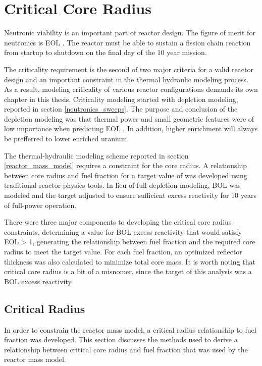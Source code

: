 \section{Critical Core Radius}

Neutronic viability is an important part of reactor design. The figure of merit
for neutronics is EOL \keff. The reactor must be able to sustain a fission
chain reaction from startup to shutdown on the final day of the 10 year mission.

The criticality requirement is the second of two major criteria for a valid reactor design and an
important constraint in the thermal hydraulic modeling process. As a result,
modeling criticality of various reactor configurations demands its own chapter
in this thesis. Criticality modeling started with depletion modeling, reported
in section \ref{neutronics_sweeps}. The purpose and conclusion of the depletion
modeling was that thermal power and small geometric features were of low
importance when predicting EOL \keff. In addition, higher enrichment will always
be prefferred to lower enriched uranium.

The thermal-hydraulic modeling scheme
reported in section \ref{reactor_mass_model} requires a constraint for the core
radius. A relationship between core radius and fuel fraction for a target
value of \keff was developed using traditional reactor physics tools. In lieu of
full depletion modeling, BOL \keff was modeled and the \keff target adjusted to
ensure sufficient excess reactivity for 10 years of full-power operation.

There were three major components to developing the critical core radius
constraints, determining a value for BOL excess reactivity that would satisfy
EOL \keff > 1, generating the relationship between fuel fraction and the
required core radius to meet the target \keff value. For each fuel fraction, an
optimized reflector thickness was also calculated to minimize total core mass.
It is worth noting that critical core radius is a
bit of a misnomer, since the target of this analysis was a BOL excess
reactivity.

\subsection{Critical Radius}
In order to constrain the reactor mass model, a critical radius relationship to
fuel fraction was developed. This section discusses the methods used to derive a
relationship between critical core radius and fuel fraction that was used by the
reactor mass model. 

